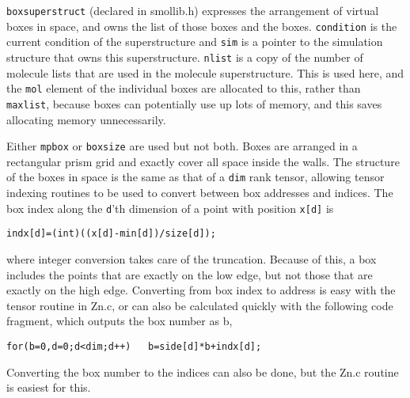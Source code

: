\documentclass {book}
\begin{document}
\texttt{boxsuperstruct} (declared in smollib.h) expresses the arrangement of virtual boxes in space, and owns the list of those boxes and the boxes.  \texttt{condition} is the current condition of the superstructure and \texttt{sim} is a pointer to the simulation structure that owns this superstructure.  \texttt{nlist} is a copy of the number of molecule lists that are used in the molecule superstructure.  This is used here, and the \texttt{mol} element of the individual boxes are allocated to this, rather than \texttt{maxlist}, because boxes can potentially use up lots of memory, and this saves allocating memory unnecessarily.

Either \texttt{mpbox} or \texttt{boxsize} are used but not both.  Boxes are arranged in a rectangular prism grid and exactly cover all space inside the walls.  The structure of the boxes in space is the same as that of a \texttt{dim} rank tensor, allowing tensor indexing routines to be used to convert between box addresses and indices.  The box index along the \texttt{d}'th dimension of a point with position \texttt{x[d]} is

\begin{lstlisting}
indx[d]=(int)((x[d]-min[d])/size[d]);
\end{lstlisting}

where integer conversion takes care of the truncation.  Because of this, a box includes the points that are exactly on the low edge, but not those that are exactly on the high edge.  Converting from box index to address is easy with the tensor routine in Zn.c, or can also be calculated quickly with the following code fragment, which outputs the box number as b,

\begin{lstlisting}
for(b=0,d=0;d<dim;d++)   b=side[d]*b+indx[d];
\end{lstlisting}

Converting the box number to the indices can also be done, but the Zn.c routine is easiest for this.
\end{document}
